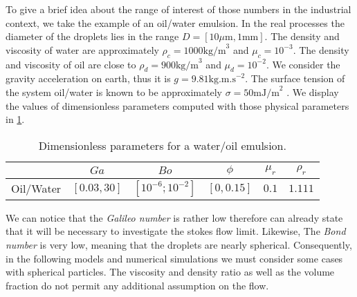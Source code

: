 To give a brief idea about the range of interest of those numbers in the industrial context, we take the example of an oil/water emulsion.
In the real processes the diameter of the droplets lies in the range $D = [10 \mu \text{m}, 1 \text{mm}]$.
The density and viscosity of water are approximately $\rho_c = 1000 \text{kg/m}^3$ and $\mu_c = 10^{-3}$.
The density and viscosity of oil are close to $\rho_d = 900 \text{kg/m}^3$ and $\mu_d = 10^{-2}$.
We consider the gravity acceleration on earth, thus it is $g= 9.81 \text{kg.m.s}^{-2}$.
The surface tension of the system oil/water is known to be approximately $\sigma = 50 \text{mJ/m}^2$ \citep{de2015gouttes}. 
We display the values of dimensionless parameters computed with those physical parameters in \ref{tab:parameters}.
\begin{table}[h!]
    \centering
    \caption{Dimensionless parameters for a water/oil emulsion.}
    \begin{tabular}{|c||c|c|c|c|c|}
        \hline&$Ga$&$Bo$&$\phi$&$\mu_r$&$\rho_r$\\ \hline
        \hline Oil/Water&$[0.03,30]$&$[10^{-6};10^{-2}]$&$[0,0.15]$&$0.1$&$1.111$\\ \hline
    \end{tabular}
    \label{tab:parameters}
\end{table}
We can notice that the \textit{Galileo number} is rather low therefore can already state that it will be necessary to investigate the stokes flow limit. 
Likewise, The \textit{Bond number} is very low, meaning that the droplets are nearly spherical.
Consequently, in the following models and numerical simulations we must consider some cases with spherical particles. 
The viscosity and density ratio as well as the volume fraction do not permit any additional assumption on the flow. 
